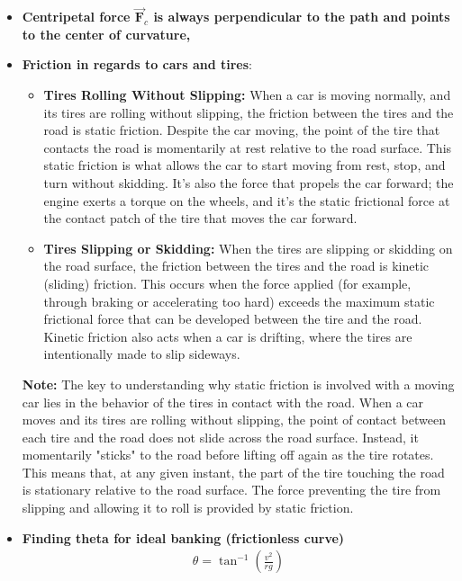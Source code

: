 \documentclass{report}
\begin{document}
\begin{itemize}
                \item \textbf{Centripetal force  $\vec{\mathbf{F}}_{c}$ is always perpendicular to the path and points to the center of curvature,}
                \item \textbf{Friction in regards to cars and tires}:
                    \begin{itemize}
                        \item \textbf{Tires Rolling Without Slipping:} When a car is moving normally, and its tires are rolling without slipping, the friction between the tires and the road is static friction. Despite the car moving, the point of the tire that contacts the road is momentarily at rest relative to the road surface. This static friction is what allows the car to start moving from rest, stop, and turn without skidding. It's also the force that propels the car forward; the engine exerts a torque on the wheels, and it's the static frictional force at the contact patch of the tire that moves the car forward.
                        \item \textbf{Tires Slipping or Skidding:} When the tires are slipping or skidding on the road surface, the friction between the tires and the road is kinetic (sliding) friction. This occurs when the force applied (for example, through braking or accelerating too hard) exceeds the maximum static frictional force that can be developed between the tire and the road. Kinetic friction also acts when a car is drifting, where the tires are intentionally made to slip sideways.
                    \end{itemize}
                    \bigbreak \noindent 
                    \textbf{Note:} The key to understanding why static friction is involved with a moving car lies in the behavior of the tires in contact with the road. When a car moves and its tires are rolling without slipping, the point of contact between each tire and the road does not slide across the road surface. Instead, it momentarily "sticks" to the road before lifting off again as the tire rotates. This means that, at any given instant, the part of the tire touching the road is stationary relative to the road surface. The force preventing the tire from slipping and allowing it to roll is provided by static friction.
                \item \textbf{Finding theta for ideal banking (frictionless curve)}
                    \begin{align*}
                        \theta = \tan^{-1}{\left(\frac{v^{2}}{rg}\right)}

\end{align*}
\end{itemize}
\end{document}
